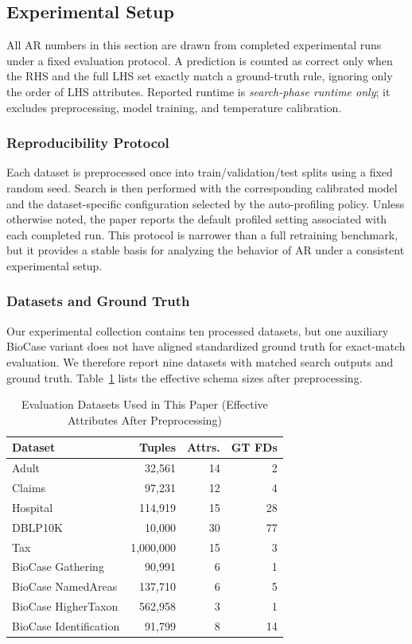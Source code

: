 \documentclass[conference]{IEEEtran}
\begin{document}
\subsection{Experimental Setup}

All AR numbers in this section are drawn from completed experimental runs under a fixed evaluation protocol. A prediction is counted as correct only when the RHS and the full LHS set exactly match a ground-truth rule, ignoring only the order of LHS attributes. Reported runtime is \emph{search-phase runtime only}; it excludes preprocessing, model training, and temperature calibration.

\subsubsection{Reproducibility Protocol}

Each dataset is preprocessed once into train/validation/test splits using a fixed random seed. Search is then performed with the corresponding calibrated model and the dataset-specific configuration selected by the auto-profiling policy. Unless otherwise noted, the paper reports the default profiled setting associated with each completed run. This protocol is narrower than a full retraining benchmark, but it provides a stable basis for analyzing the behavior of AR under a consistent experimental setup.

\subsubsection{Datasets and Ground Truth}

Our experimental collection contains ten processed datasets, but one auxiliary BioCase variant does not have aligned standardized ground truth for exact-match evaluation. We therefore report nine datasets with matched search outputs and ground truth. Table~\ref{tab:datasets} lists the effective schema sizes after preprocessing.

\begin{table}[t]
\caption{Evaluation Datasets Used in This Paper (Effective Attributes After Preprocessing)}
\label{tab:datasets}
\centering
\small
\begin{tabular}{lrrr}
\toprule
\textbf{Dataset} & \textbf{Tuples} & \textbf{Attrs.} & \textbf{GT FDs} \\
\midrule
Adult & 32,561 & 14 & 2 \\
Claims & 97,231 & 12 & 4 \\
Hospital & 114,919 & 15 & 28 \\
DBLP10K & 10,000 & 30 & 77 \\
Tax & 1,000,000 & 15 & 3 \\
BioCase Gathering & 90,991 & 6 & 1 \\
BioCase NamedAreas & 137,710 & 6 & 5 \\
BioCase HigherTaxon & 562,958 & 3 & 1 \\
BioCase Identification & 91,799 & 8 & 14 \\
\bottomrule
\end{tabular}
\end{table}
\end{document}
